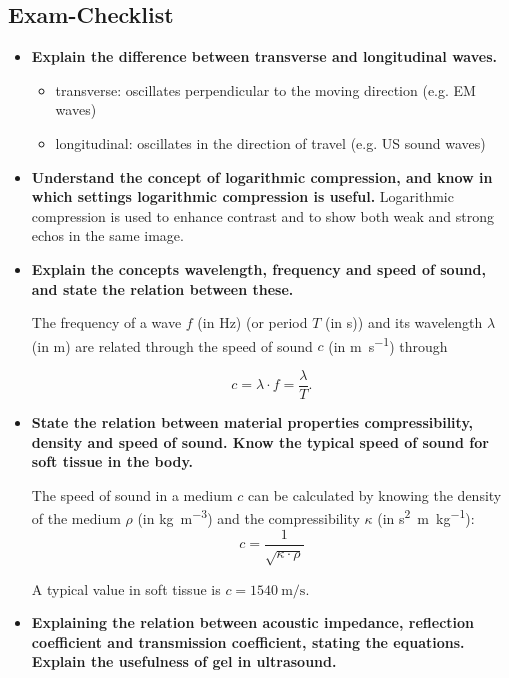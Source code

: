 \documentclass[10pt,a4paper,noendnumber=true]{scrartcl}
\begin{document}
\subsection{Exam-Checklist}
\begin{itemize}
\item \textbf{Explain the difference between transverse and longitudinal waves.}

\begin{itemize}
\item transverse: oscillates perpendicular to the moving direction (e.g. EM waves)
\item longitudinal: oscillates in the direction of travel (e.g. US sound waves)
\end{itemize}

\item \textbf{Understand the concept of logarithmic compression, and know in which settings logarithmic compression is useful.}
Logarithmic compression is used to enhance contrast and to show both weak and strong echos in the same image.

\item \textbf{Explain the concepts wavelength, frequency and speed of sound, and state the relation between these.}

The frequency of a wave $f$ (in \si{\hertz}) (or period $T$ (in \si{\s})) and its wavelength $\lambda$ (in \si{\m}) are related through the speed of sound $c$ (in \si{\m\per\s}) through

\begin{equation}
c =  \lambda \cdot f = \frac{\lambda}{T}.
\end{equation}

\item \textbf{State the relation between material properties compressibility, density and speed of sound. Know the typical speed of sound for soft tissue in the body.}

The speed of sound in a medium $c$ can be calculated by knowing the density of the medium $\rho$ (in \si{\kg\per\m\cubed}) and the compressibility $\kappa$ (in \si{\s\squared\m\per\kg}):
\begin{equation}
c=\frac{1}{\sqrt{\kappa\cdot\rho}}
\end{equation}

A typical value in soft tissue is $c=\SI{1540}{\m\per\s}$.

\item \textbf{Explaining the relation between acoustic impedance, reflection coefficient and transmission coefficient, stating the equations. Explain the usefulness of gel in ultrasound.}


\end{itemize}
\end{document}
